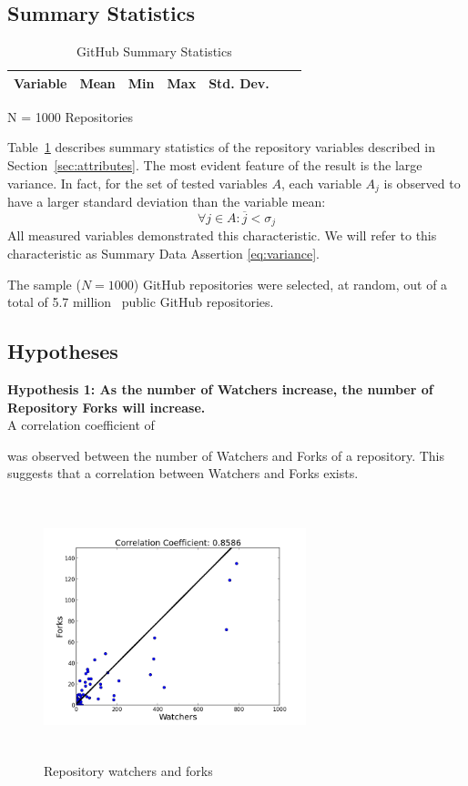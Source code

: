 \documentclass{proc}
\begin{document}
{{{{{{{\subsection{Summary Statistics}
\label{sec:summary_statistics}
\begin{table}[!ht]
\begin{center}
\begin{tabular}{rrrrrrr}
\hline
Variable & Mean & Min & Max & Std. Dev. \\
\hline

\hline
\end{tabular}
N = 1000 Repositories
\caption{GitHub Summary Statistics}
\label{table:summary_stats}
\end{center}
\end{table}

Table~\ref{table:summary_stats} describes summary statistics of the repository variables described in Section~\ref{sec:attributes}. The most evident feature of the result is the large variance. In fact, for the set of tested variables $A$, each variable $A_j$ is observed to have a larger standard deviation than the variable mean:
\begin{equation}
\forall j \in A \colon \overline{j} < \sigma_{j}
\label{eq:variance}
\end{equation}
All measured variables demonstrated this characteristic. We will refer to this characteristic as Summary Data Assertion \ref{eq:variance}.

The sample ($N = 1000$) GitHub repositories were selected, at random, out of a total of 5.7 million~\cite{githubPress} public GitHub repositories.

\subsection{Hypotheses}
\noindent \textbf{Hypothesis 1: As the number of Watchers increase, the number of Repository Forks will increase.}\\
A correlation coefficient of } was observed between the number of Watchers and Forks of a repository. This suggests that a correlation between Watchers and Forks exists.

\begin{figure}
\includegraphics[height=3in,width=3in]{images/watcher_forks_scatterplot.png}
\caption{Repository watchers and forks}
\end{figure}

}}}}}}
\end{document}
